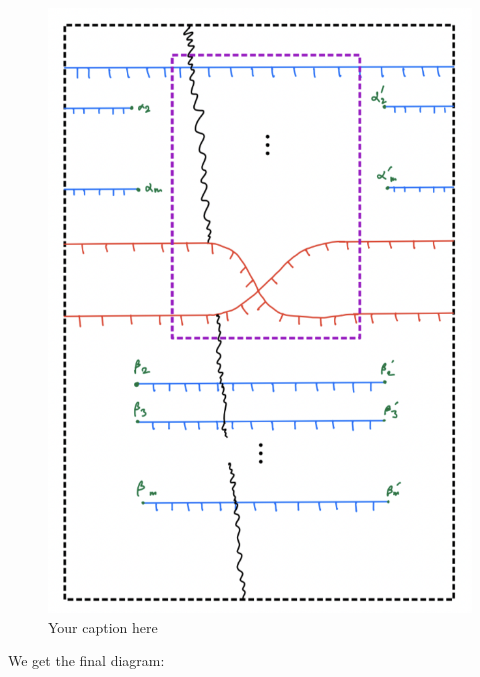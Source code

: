 \begin{figure}[H] %
    \centering
    \includegraphics[scale=0.95]{diagrams/lemma11/5.png} %
    \caption{Your caption here}
    \label{fig:your-label}
\end{figure}

We get the final diagram:

